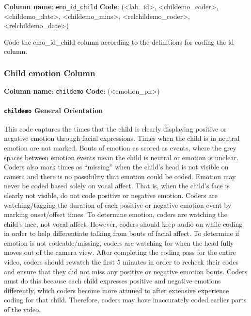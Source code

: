 \documentclass[
  12pt,
]{book}
\begin{document}
\textbf{Column name}: \texttt{emo\_id\_child}
\textbf{Code}: (\textless lab\_id\textgreater, \textless childemo\_coder\textgreater, \textless childemo\_date\textgreater, \textless childemo\_mins\textgreater, \textless relchildemo\_coder\textgreater, \textless relchildemo\_date\textgreater)

Code the emo\_id\_child column according to the definitions for coding the id column.

\hypertarget{child-emotion-column}{%
\subsubsection*{Child emotion Column}\label{child-emotion-column}}

\textbf{Column name}: \texttt{childemo}
\textbf{Code}: (\textless emotion\_pn\textgreater)

\hypertarget{childemo-general-orientation}{%
\paragraph*{\texorpdfstring{\texttt{childemo} General Orientation}{childemo General Orientation}}\label{childemo-general-orientation}}

This code captures the times that the child is clearly displaying positive or negative emotion through facial expressions. Times when the child is in neutral emotion are not marked. Bouts of emotion as scored as events, where the grey spaces between emotion events mean the child is neutral or emotion is unclear. Coders also mark times as ``missing'' when the child's head is not visible on camera and there is no possibility that emotion could be coded. Emotion may never be coded based solely on vocal affect. That is, when the child's face is clearly not visible, do not code positive or negative emotion.
Coders are watching/tagging the duration of each positive or negative emotion event by marking onset/offset times. To determine emotion, coders are watching the child's face, not vocal affect. However, coders should keep audio on while coding in order to help differentiate talking from bouts of facial affect. To determine if emotion is not codeable/missing, coders are watching for when the head fully moves out of the camera view.
After completing the coding pass for the entire video, coders should rewatch the first 5 minutes in order to recheck their codes and ensure that they did not miss any positive or negative emotion bouts. Coders must do this because each child expresses positive and negative emotions differently, which coders become more attuned to after extensive experience coding for that child. Therefore, coders may have inaccurately coded earlier parts of the video.
\end{document}
